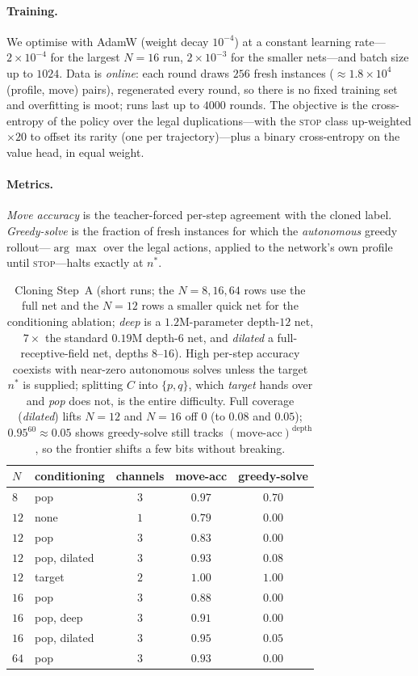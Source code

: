 \documentclass[11pt]{article}
\theoremstyle{definition}
\theoremstyle{plain}
\theoremstyle{remark}
\begin{document}
\paragraph{Training.}
We optimise with AdamW (weight decay $10^{-4}$) at a constant learning rate---$2\times10^{-4}$
for the largest $N=16$ run, $2\times10^{-3}$ for the smaller nets---and batch size up to
$1024$. Data is \emph{online}: each round draws $256$ fresh instances
($\approx1.8\times10^{4}$ (profile, move) pairs), regenerated every round, so there is no
fixed training set and overfitting is moot; runs last up to $4000$ rounds. The objective is
the cross-entropy of the policy over the legal duplications---with the \textsc{stop} class
up-weighted $\times20$ to offset its rarity (one per trajectory)---plus a binary
cross-entropy on the value head, in equal weight.

\paragraph{Metrics.}
\emph{Move accuracy} is the teacher-forced per-step agreement with the cloned label.
\emph{Greedy-solve} is the fraction of fresh instances for which the \emph{autonomous}
greedy rollout---$\arg\max$ over the legal actions, applied to the network's own profile
until \textsc{stop}---halts exactly at $n^{*}$.

\begin{table}[!ht]
\centering
\begin{tabular}{llccc}
\hline
$N$ & conditioning & channels & move-acc & greedy-solve\\
\hline
$8$  & pop         & $3$ & $0.97$ & $0.70$\\
$12$ & none         & $1$ & $0.79$ & $0.00$\\
$12$ & pop          & $3$ & $0.83$ & $0.00$\\
$12$ & pop, dilated & $3$ & $0.93$ & $0.08$\\
$12$ & target       & $2$ & $1.00$ & $\mathbf{1.00}$\\
$16$ & pop          & $3$ & $0.88$ & $0.00$\\
$16$ & pop, deep    & $3$ & $0.91$ & $0.00$\\
$16$ & pop, dilated & $3$ & $0.95$ & $0.05$\\
$64$ & pop          & $3$ & $0.93$ & $0.00$\\
\hline
\end{tabular}
\caption{Cloning Step~A (short runs; the $N=8,16,64$ rows use the full net and the $N=12$
rows a smaller quick net for the conditioning ablation; \emph{deep} is a $1.2$M-parameter
depth-$12$ net, $7\times$ the standard $0.19$M depth-$6$ net, and \emph{dilated} a
full-receptive-field net, depths $8$--$16$). High per-step accuracy coexists with near-zero
autonomous solves unless the target $n^{*}$ is supplied; splitting $C$ into $\{p,q\}$, which
\emph{target} hands over and \emph{pop} does not, is the entire difficulty. Full coverage
(\emph{dilated}) lifts $N=12$ and $N=16$ off $0$ (to $0.08$ and $0.05$); $0.95^{60}\approx
0.05$ shows greedy-solve still tracks $(\text{move-acc})^{\text{depth}}$, so the frontier
shifts a few bits without breaking.}
\label{tab:learn}
\end{table}
\end{document}
